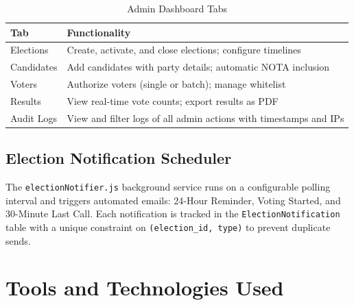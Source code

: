 \documentclass[oneside,a4paper,12pt]{book}
\begin{document}
\begin{table}[htbp]
\centering
\renewcommand{\arraystretch}{1.2}
\small
\begin{tabularx}{\textwidth}{|p{3cm}|X|}
\hline
\textbf{Tab} & \textbf{Functionality} \\
\hline
Elections & Create, activate, and close elections; configure timelines \\
\hline
Candidates & Add candidates with party details; automatic NOTA inclusion \\
\hline
Voters & Authorize voters (single or batch); manage whitelist \\
\hline
Results & View real-time vote counts; export results as PDF \\
\hline
Audit Logs & View and filter logs of all admin actions with timestamps and IPs \\
\hline
\end{tabularx}
\caption{Admin Dashboard Tabs}
\label{tab:admin_tabs}
\end{table}

\subsection{Election Notification Scheduler}
The \texttt{electionNotifier.js} background service runs on a configurable polling interval and triggers automated emails: 24-Hour Reminder, Voting Started, and 30-Minute Last Call. Each notification is tracked in the \texttt{ElectionNotification} table with a unique constraint on \texttt{(election\_id, type)} to prevent duplicate sends.

\section{Tools and Technologies Used}
\end{document}
